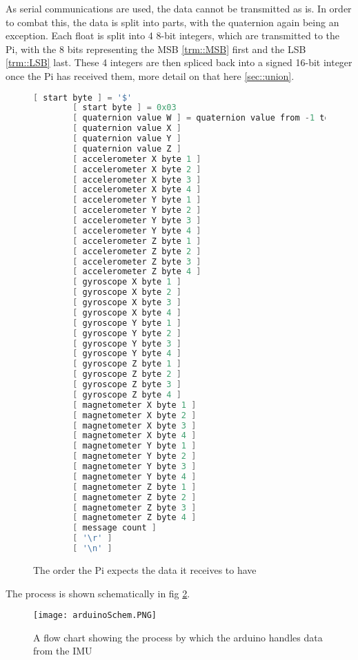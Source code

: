 As serial communications are used, the data cannot be transmitted as is.
In order to combat this, the data is split into parts, with the quaternion again being an exception.
Each float is split into 4 8-bit integers, which are transmitted to the Pi, with the 8 bits representing the MSB \ref{trm::MSB} first and the LSB \ref{trm::LSB} last.
These 4 integers are then spliced back into a signed 16-bit integer once the Pi has received them, more detail on that here \ref{sec::union}.


\begin{figure}[H]
    \begin{lstlisting}[language=c++,firstnumber=0]
        [ start byte ] = '$'
        [ start byte ] = 0x03
        [ quaternion value W ] = quaternion value from -1 to +1, multiplied by 100
        [ quaternion value X ]
        [ quaternion value Y ]
        [ quaternion value Z ]
        [ accelerometer X byte 1 ]
        [ accelerometer X byte 2 ]
        [ accelerometer X byte 3 ]
        [ accelerometer X byte 4 ]
        [ accelerometer Y byte 1 ]
        [ accelerometer Y byte 2 ]
        [ accelerometer Y byte 3 ]
        [ accelerometer Y byte 4 ]
        [ accelerometer Z byte 1 ]
        [ accelerometer Z byte 2 ]
        [ accelerometer Z byte 3 ]
        [ accelerometer Z byte 4 ]
        [ gyroscope X byte 1 ] 
        [ gyroscope X byte 2 ]
        [ gyroscope X byte 3 ]
        [ gyroscope X byte 4 ]       
        [ gyroscope Y byte 1 ] 
        [ gyroscope Y byte 2 ]
        [ gyroscope Y byte 3 ]
        [ gyroscope Y byte 4 ] 
        [ gyroscope Z byte 1 ] 
        [ gyroscope Z byte 2 ]
        [ gyroscope Z byte 3 ]
        [ gyroscope Z byte 4 ] 
        [ magnetometer X byte 1 ]
        [ magnetometer X byte 2 ]
        [ magnetometer X byte 3 ]
        [ magnetometer X byte 4 ]
        [ magnetometer Y byte 1 ]
        [ magnetometer Y byte 2 ]
        [ magnetometer Y byte 3 ]
        [ magnetometer Y byte 4 ]
        [ magnetometer Z byte 1 ]
        [ magnetometer Z byte 2 ]
        [ magnetometer Z byte 3 ]
        [ magnetometer Z byte 4 ]
        [ message count ]
        [ '\r' ] 
        [ '\n' ] 
    \end{lstlisting} 
\caption{The order the Pi expects the data it receives to have}
\label{fig::dataformat}
\end{figure}

The process is shown schematically in fig \ref{fig::ardschem}.

\begin{figure}[H]
\centering
\texttt{[image: arduinoSchem.PNG]}
\caption{A flow chart showing the process by which the arduino handles data from the IMU}
\label{fig::ardschem}
\end{figure}

